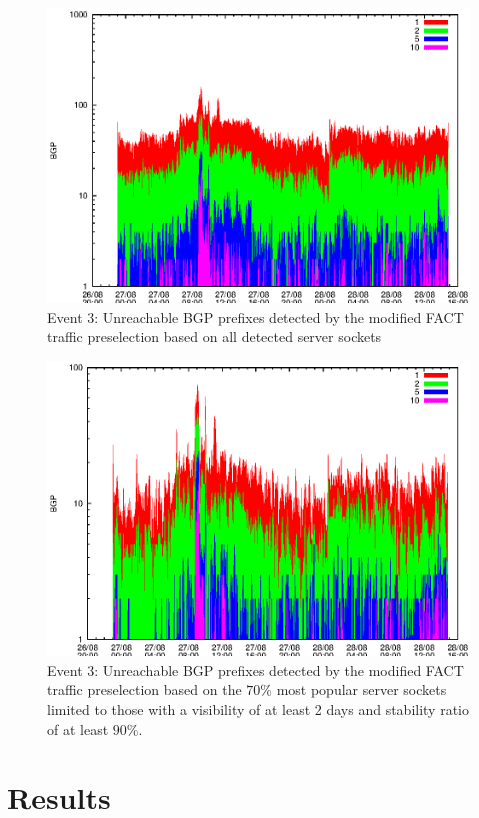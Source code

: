 \begin{figure}
	[p] \centering 
	\includegraphics[width=0.75\linewidth]{images/events/2010_08_27/bgp_log_all_external.eps}
	\caption{Event 3: Unreachable BGP prefixes detected by the modified FACT traffic preselection based on all detected server sockets} 
	\label{fig:RIPE_FACT_allSES} 
\end{figure}

\begin{figure}
	[p] \centering 
	\includegraphics[width=0.75\linewidth]{images/events/2010_08_27/bgp_log_Set_var_0_1_stab_9_vts_2.eps}
	\caption{Event 3: Unreachable BGP prefixes detected by the modified FACT traffic preselection based on the $70\%$ most popular server sockets limited to those with a visibility of at least 2 days and stability ratio of at least $90\%$.} 
	\label{fig:RIPE_FACT_popularVTS2STAB9} 
\end{figure}

\section{Results}

